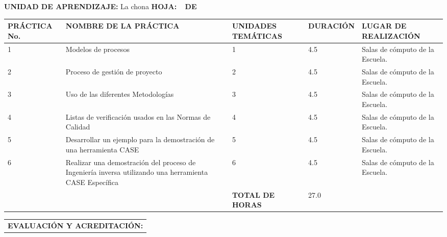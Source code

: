 \documentclass[10pt]{article}
\newcommand\tab[1][1cm]{\hspace*{#1}}
\begin{document}
\textbf{UNIDAD DE APRENDIZAJE:} La chona
\tab[1cm]
\textbf{HOJA: } \thepage\
\tab[0.25cm]
\textbf{DE } \pageref{LastPage}\\
\begin{center}
\end{center}
\begin{table}[H]
  \begin{tabular}{|p{}|p{}|p{}|p{}|p{}|}
    \hline
    \Centering\textbf{PRÁCTICA No.} & \Centering\textbf{NOMBRE DE LA PRÁCTICA} & \Centering\textbf{UNIDADES TEMÁTICAS} & \Centering\textbf{DURACIÓN} & \Centering\textbf{LUGAR DE REALIZACIÓN}\\
    \hline 
    1&Modelos de procesos&1&4.5&Salas de cómputo de la Escuela.\\2&Proceso de gestión de proyecto&2&4.5&Salas de cómputo de la Escuela.\\3&Uso de las diferentes Metodologías&3&4.5&Salas de cómputo de la Escuela.\\4&Listas de verificación usados en las Normas de Calidad&4&4.5&Salas de cómputo de la Escuela.\\5&Desarrollar un ejemplo para la demostración de una herramienta CASE&5&4.5&Salas de cómputo de la Escuela.\\6&Realizar una demostración del proceso de Ingeniería inversa utilizando una herramienta CASE Específica&6&4.5&Salas de cómputo de la Escuela.\\
    \hline &&\Centering\textbf{TOTAL DE HORAS}& 27.0 &\\\hline 
  \end{tabular}
  \begin{tabular}{|p{1.045\textwidth}|}
    \textbf{EVALUACIÓN Y ACREDITACIÓN:}


\end{tabular}
\end{table}
\end{document}
